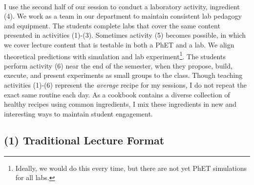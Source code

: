 \documentclass[../../../main.tex]{subfiles}
\begin{document}
\\
\vspace{0.25cm}
I use the second half of our session to conduct a laboratory activity, ingredient (4).  We work as a team in our department to maintain consistent lab pedagogy and equipment.  The students complete labs that cover the same content presented in activities (1)-(3).  Sometimes activity (5) becomes possible, in which we cover lecture content that is testable in both a PhET and a lab.  We align theoretical predictions with simulation and lab experiment\footnote{Ideally, we would do this every time, but there are not yet PhET simulations for all labs.}.  The students perform activity (6) near the end of the semester, when they propose, build, execute, and present experiments as small groups to the class.  Though teaching activities (1)-(6) represent the \textit{average} recipe for my sessions, I do not repeat the exact same routine each day.  As a cookbook contains a diverse collection of healthy recipes using common ingredients, I mix these ingredients in new and interesting ways to maintain student engagement.

\subsection{(1) Traditional Lecture Format}
\end{document}
